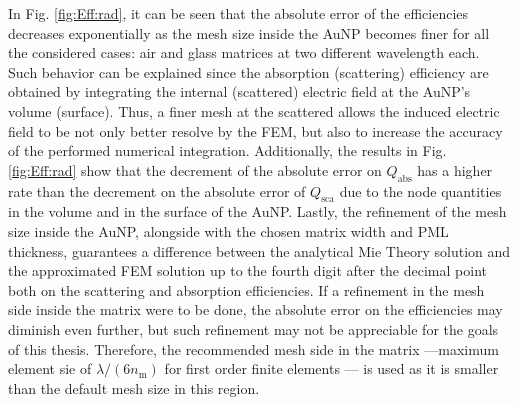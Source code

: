 In Fig. \ref{fig:Eff:rad}, it can be seen that the absolute error of the efficiencies decreases exponentially as the mesh size inside the AuNP becomes finer for all the considered cases: air and glass matrices at two different wavelength each. Such behavior can be explained since the absorption (scattering) efficiency are obtained by integrating the internal (scattered) electric field at the AuNP's volume (surface). Thus, a finer mesh at the scattered allows the induced electric field to be not only better resolve by the FEM, but also to increase the accuracy of the performed numerical integration. Additionally,  the results in Fig. \ref{fig:Eff:rad} show that the decrement of the absolute error on $Q_\text{abs}$ has a higher rate than the decrement on the absolute error of $Q_\text{sca}$ due to the node quantities in the volume and in the surface of the AuNP. Lastly, the refinement of the mesh size inside the AuNP, alongside with the chosen matrix width and PML thickness, guarantees a difference between the analytical Mie Theory solution and the approximated FEM solution up to the fourth digit after the decimal point both on the scattering and absorption efficiencies. If a refinement in the mesh side inside the matrix were to be done, the absolute error on the efficiencies may diminish even further, but such refinement may not be appreciable for the goals of this thesis. Therefore, the recommended mesh side in the matrix ---maximum element sie of $\lambda/(6n_\text{m})$ for first order finite elements \cite{comsol_doc}--- is used as it is smaller than the default mesh size in this region.








